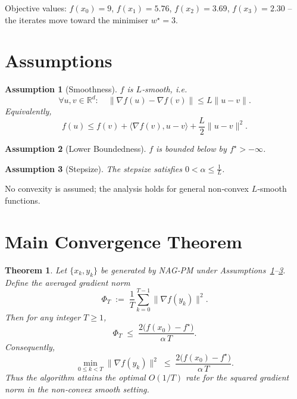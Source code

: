 \documentclass{article}
\newtheorem{theorem}{Theorem}
\newtheorem{assumption}{Assumption}
\newcommand{\R}{\mathbb{R}}
\begin{document}
Objective values: $f(x_0)=9$, $f(x_1)=5.76$, $f(x_2)=3.69$, $f(x_3)=2.30$ – the iterates move toward the minimiser $w^\star=3$.

\newpage
\section*{Assumptions}
\begin{assumption}[Smoothness]\label{as:smooth}
$f$ is $L$‑smooth, i.e.
\[
\forall u,v\in\R^d:\quad 
\|\nabla f(u)-\nabla f(v)\|\le L\|u-v\|.
\]
Equivalently,
\[
f(u)\le f(v)+\langle\nabla f(v),u-v\rangle+\frac{L}{2}\|u-v\|^2 .
\tag{3}
\]
\end{assumption}

\begin{assumption}[Lower Boundedness]\label{as:lb}
$f$ is bounded below by $f^\star>-\infty$.
\end{assumption}

\begin{assumption}[Stepsize]\label{as:step}
The stepsize satisfies $0<\alpha\le \frac{1}{L}$.
\end{assumption}

No convexity is assumed; the analysis holds for general non‑convex $L$‑smooth functions.

\section*{Main Convergence Theorem}
\begin{theorem}\label{thm:main}
Let $\{x_k,y_k\}$ be generated by NAG‑PM under Assumptions~\ref{as:smooth}–\ref{as:step}.
Define the averaged gradient norm
\[
\Phi_T\;:=\;\frac{1}{T}\sum_{k=0}^{T-1}\|\nabla f(y_k)\|^2 .
\]
Then for any integer $T\ge 1$,
\[
\Phi_T\;\le\;\frac{2\bigl(f(x_0)-f^\star\bigr)}{\alpha\,T}.
\tag{4}
\]
Consequently,
\[
\min_{0\le k<T}\|\nabla f(y_k)\|^2\;\le\;\frac{2\bigl(f(x_0)-f^\star\bigr)}{\alpha\,T}.
\tag{5}
\]
Thus the algorithm attains the optimal $O(1/T)$ rate for the squared gradient norm in the non‑convex smooth setting.
\end{theorem}
\end{document}
